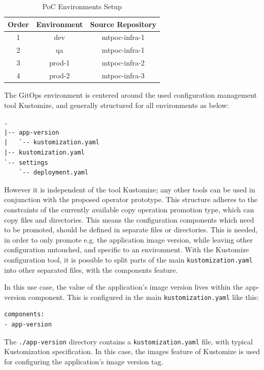 \begin{table}[h]
\begin{center}
	\begin{tabular}{||c c c||} 
		\hline
		Order & Environment & Source Repository \\ [0.5ex] 
		\hline\hline
		1 & dev & mtpoc-infra-1 \\ 
		\hline
		2 & qa & mtpoc-infra-1 \\
		\hline
		3 & prod-1 & mtpoc-infra-2 \\
		\hline
		4 & prod-2 & mtpoc-infra-3 \\
		\hline
	\end{tabular}
	\caption{PoC Environments Setup}
	\label{table:poc-environments-setup}
\end{center}
\end{table}

The GitOps environment is centered around the used configuration management tool
Kustomize, and generally structured for all environments as below:

\begin{lstlisting}
.
|-- app-version
|   `-- kustomization.yaml
|-- kustomization.yaml
`-- settings
    `-- deployment.yaml
\end{lstlisting}

However it is independent of the tool Kustomize;
any other tools can be used in conjunction with the proposed operator prototype.
This structure adheres to the constraints of the currently available
copy operation promotion type, which can copy files and directories.
This means the configuration components which need to be promoted,
should be defined in separate files or directories.
This is needed, in order to only promote e.g. the application image version,
while leaving other configuration untouched, and specific to an environment.
With the Kustomize configuration tool, it is possible to split
parts of the main \lstinline|kustomization.yaml| into other separated files,
with the components feature.

In this use case, the value of the application's image version lives within the 
app-version component. This is configured in the main \lstinline|kustomization.yaml|
like this:

\begin{lstlisting}
components:
- app-version
\end{lstlisting}

The \lstinline|./app-version| directory contains a \lstinline|kustomization.yaml| file,
with typical Kustomization specification.
In this case, the images feature of Kustomize is used for configuring the application's
image version tag.

